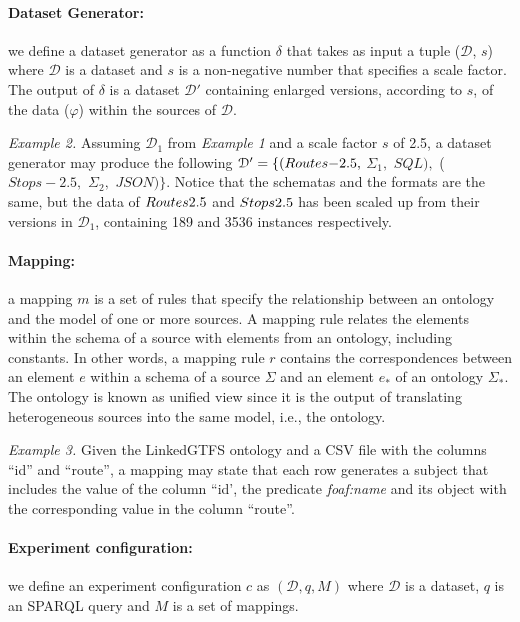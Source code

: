 \paragraph{\textbf{Dataset Generator:}} we define a dataset generator as a function $\delta$ that takes as input a tuple ($\mathcal{D}$, $s$) where  $\mathcal{D}$ is a dataset and $s$ is a non-negative number that specifies a scale factor. The output of $\delta$ is a dataset $\mathcal{D'}$ containing enlarged versions, according to $s$, of the data ($\varphi$) within the sources of $\mathcal{D}$.

\textit{Example 2.} Assuming $\mathcal{D}_{1}$ from \textit{Example 1} and a scale factor $s$ of 2.5, a dataset generator may produce the following $\mathcal{D'}=\{(Rou\-tes{-}2.5,$ $\Sigma_1,$ $SQL),$ ($Stops{-}2.5,$ $\Sigma_2,$ $JSON)\}$. Notice that the schematas and the formats are the same, but the data of $Rou\-tes\-2.5$ and $Stops\-2.5$ has been scaled up from their versions in $\mathcal{D}_{1}$, containing 189 and 3536 instances respectively.

\paragraph{\textbf{Mapping:}} a mapping $m$ is a set of rules that specify the relationship between an ontology and the model of one or more sources. A mapping rule relates the elements within the schema of a source with elements from an ontology, including constants. In other words, a mapping rule $r$ contains the correspondences between an element $e$ within a schema of a source $\Sigma$ and an element $e_*$ of an ontology $\Sigma_*$. The ontology is known as unified view since it is the output of translating heterogeneous sources into the same model, i.e., the ontology.

\textit{Example 3.} Given the LinkedGTFS ontology and a CSV file with the columns ``id'' and ``route'', a mapping may state that each row generates a subject that includes the value of the column ``id', the predicate \textit{foaf:name} and its object with the corresponding value in the column ``route''.

\paragraph{\textbf{Experiment configuration:}} we define an experiment configuration $c$ as $(\mathcal{D}, q, M)$ where $\mathcal{D}$ is a dataset, $q$ is an SPARQL query and $M$ is a set of mappings.

